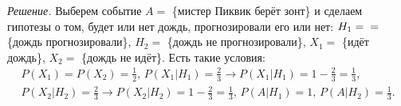 \textit{Решение.}
Выберем событие $A =$ \{мистер Пиквик берёт зонт\} и сделаем гипотезы о том,
будет или нет дождь, прогнозировали его или нет: $H_1 = \\ =$ \{дождь прогнозировали\}, $H_2 =$ \{дождь не прогнозировали\}, $X_1 =$ \{идёт дождь\}, $X_2 =$ \{дождь не идёт\}.
Есть такие условия:
\begin{equation*}
\begin{split}
P \left( X_1 \right) =
P \left( X_2 \right) =
\frac{1}{2}, \,
P \left( \left. X_1 \right| H_1 \right) =
\frac{2}{3} \rightarrow
P \left( \left. X_1 \right| H_1 \right) =
1 - \frac{2}{3} =
\frac{1}{3}, \\
P \left( \left. X_2 \right| H_2 \right) =
\frac{2}{3} \rightarrow
P \left( \left. X_2 \right| H_2 \right) =
1 - \frac{2}{3} =
\frac{1}{3}, \,
P \left( \left. A \right| H_1 \right) =
1, \,
P \left( \left. A \right| H_2 \right) =
\frac{1}{3}.
\end{split}
\end{equation*}

